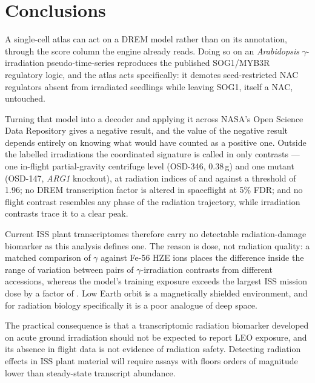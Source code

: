 \documentclass[11pt,a4paper]{article}
\begin{document}





\section*{Conclusions}

A single-cell atlas can act on a DREM model rather than on its annotation, through the
score column the engine already reads. Doing so on an \textit{Arabidopsis}
$\gamma$-irradiation pseudo-time-series reproduces the published SOG1/MYB3R regulatory
logic, and the atlas acts specifically: it demotes seed-restricted NAC regulators absent
from irradiated seedlings while leaving SOG1, itself a NAC, untouched.

Turning that model into a decoder and applying it across NASA's Open Science Data
Repository gives a negative result, and the value of the negative result depends entirely
on knowing what would have counted as a positive one. Outside the labelled irradiations
the coordinated signature is called in only \NumNovelRadiationCalls{} contrasts --- one
in-flight partial-gravity centrifuge level (OSD-346, 0.38\,g) and one mutant (OSD-147,
\textit{ARG1} knockout), at radiation indices of \NovelGravityIndex{} and
\NovelGenotypeIndex{} against a threshold of 1.96; no DREM transcription factor is
altered in spaceflight at 5\% FDR; and no flight contrast resembles any phase of the
radiation trajectory, while irradiation contrasts trace it to a clear peak.

Current ISS plant transcriptomes therefore carry no detectable radiation-damage biomarker
as this analysis defines one. The reason is dose, not radiation quality: a matched
comparison of $\gamma$ against Fe-56 HZE ions places the difference inside the range of
variation between pairs of $\gamma$-irradiation contrasts from different accessions, whereas the model's
training exposure exceeds the largest ISS mission dose by a factor of
\TrainingToIssFold{}. Low Earth orbit is a magnetically shielded environment, and for
radiation biology specifically it is a poor analogue of deep space.

The practical consequence is that a transcriptomic radiation biomarker developed on acute
ground irradiation should not be expected to report LEO exposure, and its absence in
flight data is not evidence of radiation safety. Detecting radiation effects in ISS plant
material will require assays with floors orders of magnitude lower than steady-state
transcript abundance.
\end{document}
